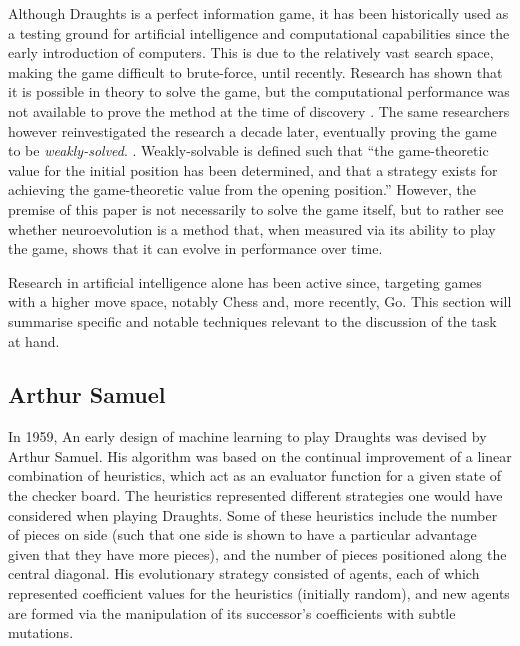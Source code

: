 \documentclass[12pt,a4paper]{article}
\begin{document}
        Although Draughts is a perfect information game, it has been historically used as a testing ground for artificial intelligence and computational capabilities since the early introduction of computers. This is due to the relatively vast search space, making the game difficult to brute-force, until recently. Research has shown that it is possible in theory to solve the game, but the computational performance was not available to prove the method at the time of discovery \cite{schaeffer_solving_1996}. The same researchers however reinvestigated the research a decade later, eventually proving the game to be \emph{weakly-solved}. \cite{schaeffer_checkers_2007}. Weakly-solvable is defined such that ``the game-theoretic value for the initial position has been determined, and that a strategy exists for achieving the game-theoretic value from the opening position.'' \cite{allis_searching_1994} However, the premise of this paper is not necessarily to solve the game itself, but to rather see whether neuroevolution is a method that, when measured via its ability to play the game, shows that it can evolve in performance over time.

        Research in artificial intelligence alone has been active since, targeting games with a higher move space, notably Chess and, more recently, Go. This section will summarise specific and notable techniques relevant to the discussion of the task at hand.

    \subsection{Arthur Samuel}
        In 1959, An early design of machine learning to play Draughts was devised by Arthur Samuel\cite{samuel_studies_1959}. His algorithm was based on the continual improvement of a linear combination of heuristics, which act as an evaluator function for a given state of the checker board. The heuristics represented different strategies one would have considered when playing Draughts. Some of these heuristics include the number of pieces on side (such that one side is shown to have a particular advantage given that they have more pieces), and the number of pieces positioned along the central diagonal. His evolutionary strategy consisted of agents, each of which represented coefficient values for the heuristics (initially random), and new agents are formed via the manipulation of its successor's coefficients with subtle mutations.
        
        
\end{document}
